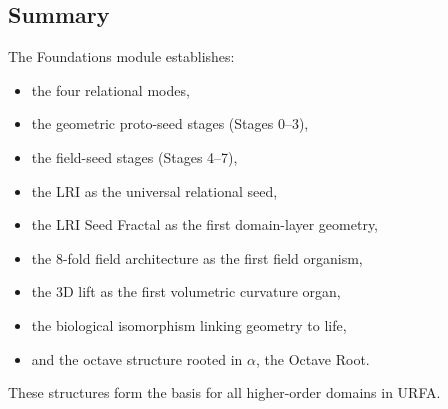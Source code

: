 \subsection{Summary}

The Foundations module establishes:

\begin{itemize}
    \item the four relational modes,
    \item the geometric proto-seed stages (Stages 0–3),
    \item the field-seed stages (Stages 4–7),
    \item the LRI as the universal relational seed,
    \item the LRI Seed Fractal as the first domain-layer geometry,
    \item the 8-fold field architecture as the first field organism,
    \item the 3D lift as the first volumetric curvature organ,
    \item the biological isomorphism linking geometry to life,
    \item and the octave structure rooted in $\alpha$, the Octave Root.
\end{itemize}

These structures form the basis for all higher-order domains in URFA.